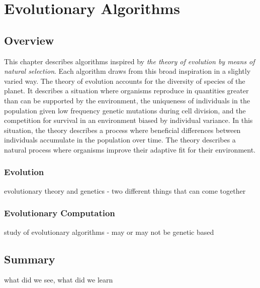 \chapter{Evolutionary Algorithms}
\label{ch:evolution}

\section{Overview}
This chapter describes algorithms inspired by \emph{the theory of evolution by means of natural selection}. Each algorithm draws from this broad inspiration in a slightly varied way. The theory of evolution accounts for the diversity of species of the planet. It describes a situation where organisms reproduce in quantities greater than can be supported by the environment, the uniqueness of individuals in the population given low frequency genetic mutations during cell division, and the competition for survival in an environment biased by individual variance. In this situation, the theory describes a process where beneficial differences between individuals accumulate in the population over time. The theory describes a natural process where organisms improve their adaptive fit for their environment.

\subsection{Evolution}
evolutionary theory and genetics - two different things that can come together

\subsection{Evolutionary Computation}
study of evolutionary algorithms - may or may not be genetic based












\section{Summary}
what did we see, what did we learn




